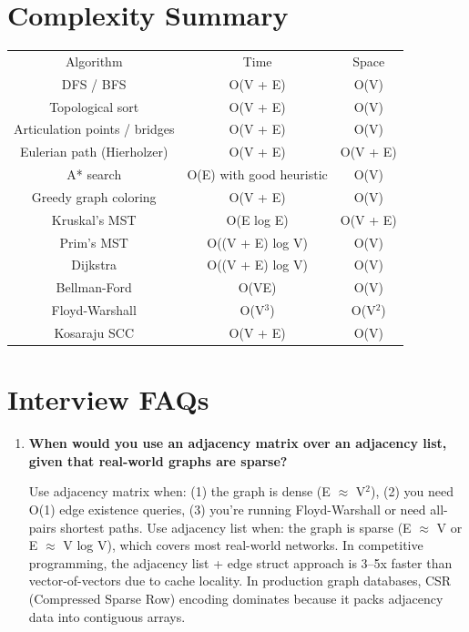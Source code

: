 \section{Complexity Summary}

\begin{center}
\begin{tabular}{ccc}
\toprule
Algorithm & Time & Space \\
DFS / BFS & O(V + E) & O(V) \\
Topological sort & O(V + E) & O(V) \\
Articulation points / bridges & O(V + E) & O(V) \\
Eulerian path (Hierholzer) & O(V + E) & O(V + E) \\
A* search & O(E) with good heuristic & O(V) \\
Greedy graph coloring & O(V + E) & O(V) \\
Kruskal's MST & O(E log E) & O(V + E) \\
Prim's MST & O((V + E) log V) & O(V) \\
Dijkstra & O((V + E) log V) & O(V) \\
Bellman-Ford & O(VE) & O(V) \\
Floyd-Warshall & O(V$^{3}$) & O(V$^{2}$) \\
Kosaraju SCC & O(V + E) & O(V) \\

\bottomrule
\end{tabular}
\end{center}

\section{Interview FAQs}

\begin{enumerate}
\item \textbf{When would you use an adjacency matrix over an adjacency list, given that real-world graphs are sparse?}

Use adjacency matrix when: (1) the graph is dense (E $\approx$ V$^{2}$), (2) you need O(1) edge existence queries, (3) you're running Floyd-Warshall or need all-pairs shortest paths. Use adjacency list when: the graph is sparse (E $\approx$ V or E $\approx$ V log V), which covers most real-world networks. In competitive programming, the adjacency list + edge struct approach is 3--5x faster than vector-of-vectors due to cache locality. In production graph databases, CSR (Compressed Sparse Row) encoding dominates because it packs adjacency data into contiguous arrays.
\end{enumerate}

